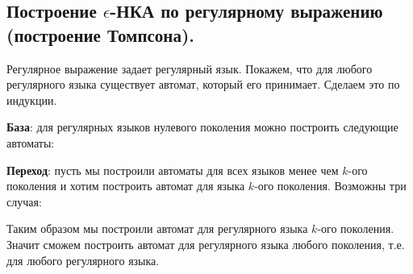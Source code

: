 \subsection{%
  Построение \(\epsilon\)-НКА по регулярному выражению (построение Томпсона).%
} \label{thompson-construction}

Регулярное выражение задает регулярный язык. Покажем, что для любого регулярного
языка существует автомат, который его принимает. Сделаем это по индукции.

\textbf{База}: для регулярных языков нулевого поколения можно построить
следующие автоматы:



\textbf{Переход}: пусть мы построили автоматы для всех языков менее чем
\(k\)-ого поколения и хотим построить автомат для языка \(k\)-ого поколения.
Возможны три случая:



Таким образом мы построили автомат для регулярного языка \(k\)-ого поколения.
Значит сможем построить автомат для регулярного языка любого поколения, т.е. для
любого регулярного языка.
